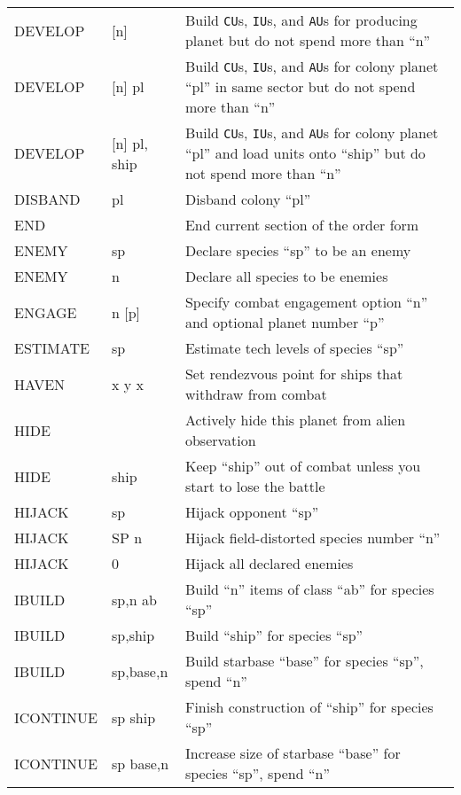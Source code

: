\documentclass[10pt,titlepage]{article}
\begin{document}
\begin{longtable}{llp{9cm}}
DEVELOP     &    [n]       &      Build \texttt{CU}s, \texttt{IU}s, and \texttt{AU}s for producing planet but do not spend more than ``n'' \\
DEVELOP    &     [n] pl   &       Build \texttt{CU}s, \texttt{IU}s, and \texttt{AU}s for colony planet ``pl'' in same sector but do not spend more than ``n''  \\
DEVELOP    &     [n] pl, ship &    Build \texttt{CU}s, \texttt{IU}s, and \texttt{AU}s for colony planet ``pl''  and load units onto ``ship'' but do not spend more than ``n'' \\
DISBAND   &      pl      &        Disband colony ``pl'' \\
END       &              &        End current section of the order form \\
ENEMY     &      sp      &        Declare species ``sp'' to be an enemy \\
ENEMY     &      n       &        Declare all species to be enemies \\
ENGAGE    &      n [p]      &     Specify combat engagement option ``n'' and optional planet number ``p'' \\
ESTIMATE  &      sp         &     Estimate tech levels of species ``sp''  \\
HAVEN    &       x y x      &     Set rendezvous point for ships that withdraw from combat \\
HIDE   &                    &     Actively hide this planet from alien observation \\
HIDE   &         ship       &     Keep ``ship'' out of combat unless you start to lose the battle \\
HIJACK  &        sp         &     Hijack opponent ``sp'' \\
HIJACK  &        SP n       &     Hijack field-distorted species number ``n'' \\
HIJACK  &        0          &     Hijack all declared enemies \\
IBUILD  &        sp,n ab    &     Build ``n'' items of class ``ab'' for species ``sp'' \\
IBUILD  &        sp,ship    &     Build ``ship'' for species ``sp'' \\
IBUILD  &        sp,base,n   &    Build starbase ``base'' for species ``sp'', spend ``n'' \\
ICONTINUE &      sp ship     &    Finish construction of ``ship'' for species ``sp'' \\
ICONTINUE &      sp base,n   &    Increase size of starbase ``base'' for species ``sp'', spend ``n'' \\

\end{longtable}
\end{document}
